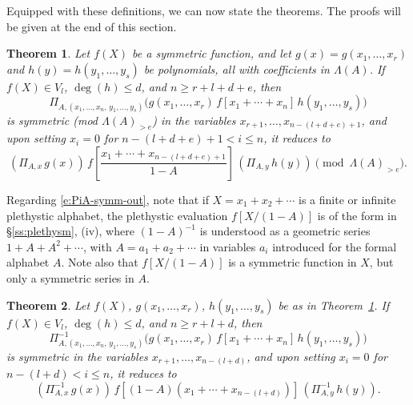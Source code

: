 \documentclass[12pt]{amsart}
\newtheorem{thm}{Theorem}[subsection]
\theoremstyle{definition}
\theoremstyle{remark}
\begin{document}
Equipped with these definitions, we can now state the theorems.  The
proofs will be given at the end of this section. 

\begin{thm}\label{thm:PiA-symm}
Let $f(X)$ be a symmetric function, and let $g(x) =
g(x_{1},\ldots,x_{r})$ and $h(y) = h(y_{1},\ldots,y_{s})$ be
polynomials, all with coefficients in $\Lambda (A)$.  If $f(X)\in
V_{l}$, $\deg (h)\leq d$, and $n\geq r+l+d+e$, then
\begin{equation}\label{e:PiA-symm-in}
\Pi _{A,(x_{1}, \ldots, x_{n},\, y_{1},\ldots,y_{s})}
\bigl(g(x_{1},\ldots,x_{r})\, f[x_{1}+\cdots +x_{n}] \,
h(y_{1},\ldots,y_{s})\bigr)
\end{equation}
is symmetric {\rm (mod $\Lambda (A)_{>e}$)} in the variables
$x_{r+1},\ldots,x_{n-(l+d+e)+1}$, and upon setting $x_{i} = 0$ for
$n-(l+d+e)+1<i\leq n$, it reduces to
\begin{equation}\label{e:PiA-symm-out}
(\Pi _{A,x}\, g(x))\, f \! \left[\frac{x_{1}+\cdots
+x_{n-(l+d+e)+1}}{1-A} \right]\, (\Pi _{A,y}\, h(y)) \pmod{\Lambda
(A)_{>e}}.
\end{equation}
\end{thm}

Regarding \eqref{e:PiA-symm-out}, note that if $X = x_{1}+x_{2}+\cdots
$ is a finite or infinite plethystic alphabet, the plethystic
evaluation $f[X/(1-A)]$ is of the form in \S \ref{ss:plethysm}, (iv),
where $(1-A)^{-1}$ is understood as a geometric series
$1+A+A^{2}+\cdots $, with $A = a_{1}+a_{2}+\cdots $ in variables
$a_{i}$ introduced for the formal alphabet $A$.  Note also that
$f[X/(1-A)]$ is a symmetric function in $X$, but only a symmetric
series in $A$.

\begin{thm}\label{thm:PiA-inv-symm}
Let $f(X)$, $g(x_{1},\ldots,x_{r})$, $h(y_{1},\ldots,y_{s})$ be as in
Theorem~\ref{thm:PiA-symm}.  If $f(X)\in V_{l}$, $\deg (h)\leq d$, and
$n\geq r+l+d$, then
\begin{equation}\label{e:PiA-inv-symm-in}
\Pi _{A,(x_{1}, \ldots, x_{n},\, y_{1},\ldots,y_{s})}^{-1}
\bigl(g(x_{1},\ldots,x_{r})\, f[x_{1}+\cdots +x_{n}] \,
h(y_{1},\ldots,y_{s})\bigr)
\end{equation}
is symmetric in the variables $x_{r+1},\ldots,x_{n-(l+d)}$, and upon
setting $x_{i} = 0$ for $n-(l+d)<i\leq n$, it reduces to
\begin{equation}\label{e:PiA-inv-symm-out}
(\Pi _{A,x}^{-1}\, g(x))\, f \left[(1-A)(x_{1}+\cdots +x_{n-(l+d)})
\right]\, (\Pi _{A,y}^{-1}\, h(y)).
\end{equation}
\end{thm}
\end{document}
